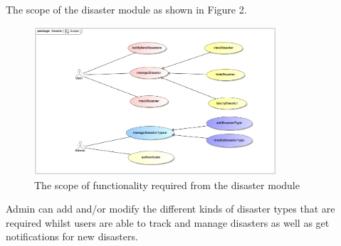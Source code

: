 The scope of the disaster module as shown in Figure 2.

\begin{figure}[ht!]
\centering
\includegraphics[width=90mm]{../images/Scope.jpg}
\caption{The scope of functionality required from the disaster module \label{overflow}}
\end{figure}

Admin can add and/or modify the different kinds of disaster types that are required whilst users are able to track and manage disasters as well as get notifications for new disasters. 